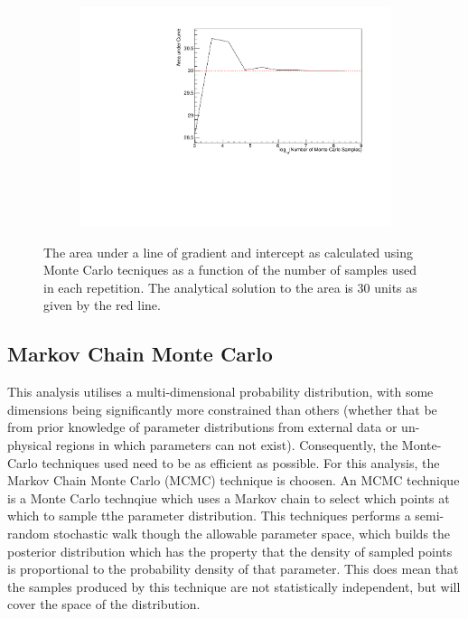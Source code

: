 \begin{figure}[h]
  \begin{subfigure}[t]{0.80\textwidth}
    \includegraphics[width=\textwidth, trim={0mm 0mm 0mm 0mm}, clip,page=1]{Figures/MCMC/MCTechnique_NThrowsStudy.pdf}
  \end{subfigure}
  \caption{The area under a line of gradient  and intercept  as calculated using Monte Carlo tecniques as a function of the number of samples used in each repetition. The analytical solution to the area is 30 units as given by the red line.}
  \label{fig:MCMC_MCTechniqueNThrowsStudy}
\end{figure}


\subsection{Markov Chain Monte Carlo}
\label{sec:MarkovChainMonteCarlo_MetropoliseHastingsAlgorithm}
This analysis utilises a multi-dimensional probability distribution, with some dimensions being significantly more constrained than others (whether that be from prior knowledge of parameter distributions from external data or un-physical regions in which parameters can not exist). Consequently, the Monte-Carlo techniques used need to be as efficient as possible. For this analysis, the Markov Chain Monte Carlo (MCMC) technique is choosen. An MCMC technique is a Monte Carlo technqiue which uses a Markov chain to select which points at which to sample tthe parameter distribution. This techniques performs a semi-random stochastic walk though the allowable parameter space, which builds the posterior distribution which has the property that the density of sampled points is proportional to the probability density of that parameter. This does mean that the samples produced by this technique are not statistically independent, but will cover the space of the distribution.

